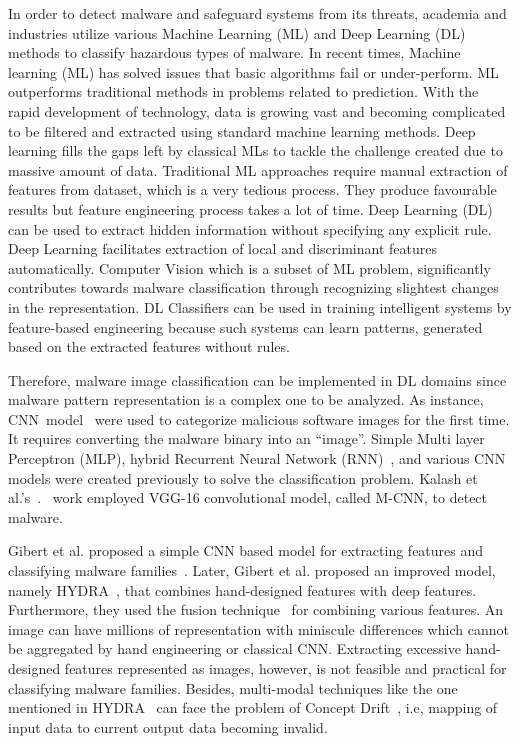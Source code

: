 \documentclass[pdflatex,sn-mathphys]{sn-jnl}%
\begin{document}
\par
\color{black}In order to detect malware and safeguard systems from its threats, academia and industries utilize various Machine Learning (ML) and Deep Learning (DL) methods to classify hazardous types of malware. In recent times, Machine learning (ML) has solved issues that basic algorithms fail or under-perform. ML outperforms traditional methods in problems related to prediction. With the rapid development of technology, data is growing vast and becoming complicated to be filtered and extracted using standard machine learning methods. Deep learning fills the gaps left by classical MLs to tackle the challenge created due to massive amount of data. Traditional ML approaches require manual extraction of features from dataset, which is a very tedious process. \color{blue}They produce favourable results but feature engineering process takes a lot of time. Deep Learning (DL) can be used to extract hidden information without specifying any explicit rule. \color{black}Deep Learning facilitates extraction of local and discriminant features automatically. Computer Vision which is a subset of ML problem, significantly contributes towards malware classification through recognizing slightest changes in the representation. DL Classifiers can be used in training intelligent systems by feature-based engineering because such systems can learn patterns, generated based on the extracted features without rules. 

 Therefore, malware image classification can be implemented in DL domains since malware pattern representation is a complex one to be analyzed. As instance, CNN~model~\cite{19} were used to categorize malicious software images for the first time. It requires converting the malware binary into an ``image''. Simple Multi layer Perceptron (MLP), hybrid Recurrent Neural Network (RNN)~\cite{22}, and various CNN models were created previously to solve the classification problem. Kalash et al.'s~.~\cite{07} work employed VGG-16 convolutional model, called M-CNN, to detect malware. 

Gibert et al. proposed a simple CNN based model for extracting features and classifying malware families~\cite{19}. Later, Gibert et al. proposed an improved model, namely HYDRA~\cite{37}, that combines hand-designed features with deep features. Furthermore, they used the fusion technique~\cite{25} for combining various features. An image can have  millions of representation with miniscule differences which cannot be aggregated by hand engineering or classical CNN. Extracting excessive hand-designed features represented as images, however, is not feasible and practical for classifying malware families. Besides, multi-modal techniques like the one mentioned in HYDRA~\cite{37} can face the problem of Concept Drift~\cite{37}, i.e, mapping of input data to current output data becoming invalid. 
\end{document}
